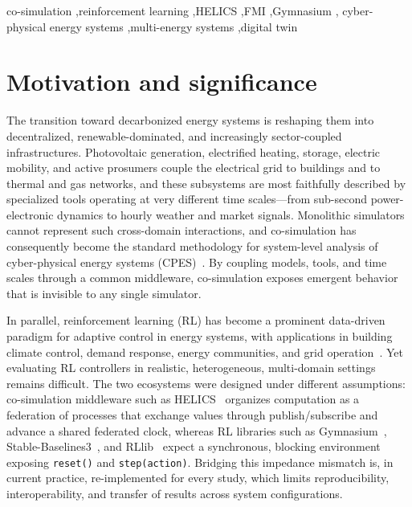 \documentclass[preprint,12pt]{elsarticle}
\begin{document}
\begin{frontmatter}
\begin{keyword}
co-simulation \sep reinforcement learning \sep HELICS \sep FMI \sep Gymnasium \sep
cyber-physical energy systems \sep multi-energy systems \sep digital twin
\end{keyword}
\end{frontmatter}


\section{Motivation and significance}\label{sec:intro}
The transition toward decarbonized energy systems is reshaping them into
decentralized, renewable-dominated, and increasingly sector-coupled
infrastructures. Photovoltaic generation, electrified heating, storage, electric
mobility, and active prosumers couple the electrical grid to buildings and to
thermal and gas networks, and these subsystems are most faithfully described by
specialized tools operating at very different time scales---from sub-second
power-electronic dynamics to hourly weather and market signals. Monolithic
simulators cannot represent such cross-domain interactions, and co-simulation has
consequently become the standard methodology for system-level analysis of
cyber-physical energy systems (CPES)~\cite{helics,mosaik}. By coupling models,
tools, and time scales through a common middleware, co-simulation exposes emergent
behavior that is invisible to any single simulator.

In parallel, reinforcement learning (RL) has become a prominent data-driven
paradigm for adaptive control in energy systems, with applications in building
climate control, demand response, energy communities, and grid
operation~\cite{rl_energy_review}. Yet evaluating RL controllers in realistic,
heterogeneous, multi-domain settings remains difficult. The two ecosystems were
designed under different assumptions: co-simulation middleware such as
HELICS~\cite{helics} organizes computation as a federation of processes that
exchange values through publish/subscribe and advance a shared federated clock,
whereas RL libraries such as Gymnasium~\cite{gymnasium},
Stable-Baselines3~\cite{sb3}, and RLlib~\cite{rllib} expect a synchronous,
blocking environment exposing \texttt{reset()} and \texttt{step(action)}. Bridging
this impedance mismatch is, in current practice, re-implemented for every study,
which limits reproducibility, interoperability, and transfer of results across
system configurations.
\end{document}
